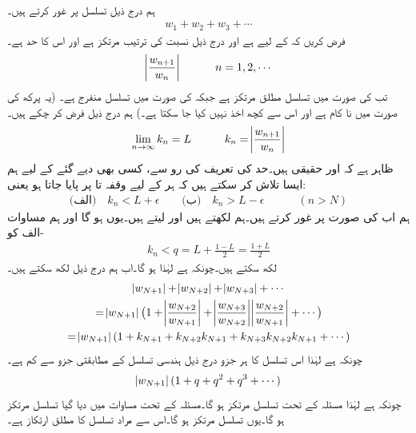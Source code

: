 \quad {}\\
ہم درج ذیل تسلسل پر غور کرتے ہیں۔
\begin{align*}
w_1+w_2+w_3+\cdots
\end{align*}
فرض کریں کہ  کے لیے  ہے اور درج ذیل نسبت کی ترتیب مرتکز ہے اور اس  کا حد  ہے۔
\begin{align*}
\abs{\frac{w_{n+1}}{w_n}}\quad \quad \quad n=1,2,\cdots
\end{align*}
تب  کی صورت میں تسلسل مطلق مرتکز ہے جبکہ  کی صورت میں تسلسل منفرج ہے۔ (یہ پرکھ  کی صورت میں نا کام ہے اور اس سے کچھ اخذ نہیں کیا جا سکتا ہے۔)
\quad
ہم درج ذیل فرض کر چکے ہیں۔
\begin{align*}
\lim_{n\to\infty} k_n=L \quad \quad \quad k_n=\abs{\frac{w_{n+1}}{w_n}}
\end{align*}
ظاہر ہے کہ  اور  حقیقی ہیں۔حد کی تعریف کی رو سے، کسی بھی دیے گئے  کے لیے ہم ایسا  تلاش کر سکتے ہیں کہ ہر  کے لیے  وقفہ  تا  پر پایا جاتا ہو یعنی:
\begin{align}\label{مساوات_ترتیب_نسبت_الف}
\text{(الف)}\quad k_n<L+\epsilon \quad \quad \text{(ب)}\quad k_n>L-\epsilon\quad \quad \quad (n>N)
\end{align}
ہم اب  کی صورت پر غور کرتے ہیں۔ہم  لکھتے ہیں اور  لیتے ہیں۔یوں  ہو گا اور ہم  مساوات -الف کو
\begin{align*}
k_n<q=L+\frac{1-L}{2}=\frac{1+L}{2}
\end{align*}
لکھ سکتے ہیں۔چونکہ  ہے لہٰذا  ہو گا۔اب ہم درج ذیل لکھ سکتے ہیں۔
\begin{multline}\label{مساوات_ترتیب_نسبت_ب}
\abs{w_{N+1}}+\abs{w_{N+2}}+\abs{w_{N+3}}+\cdots\\
=\abs{w_{N+1}}\big(1+\abs{\frac{w_{N+2}}{w_{N+1}}}+\abs{\frac{w_{N+3}}{w_{N+2}}}\abs{\frac{w_{N+2}}{w_{N+1}}}+\cdots\big)\\
=\abs{w_{N+1}}(1+k_{N+1}+k_{N+2}k_{N+1}+k_{N+3}k_{N+2}k_{N+1}+\cdots)
\end{multline}
چونکہ  ہے لہٰذا اس تسلسل کا ہر جزو درج ذیل ہندسی تسلسل کے مطابقتی جزو سے کم ہے۔
\begin{align*}
\abs{w_{N+1}}(1+q+q^2+q^3+\cdots)
\end{align*}
چونکہ  ہے لہٰذا مسئلہ  کے تحت تسلسل مرتکز ہو گا۔مسئلہ  کے تحت  مساوات  میں دیا گیا تسلسل مرتکز ہو گا۔یوں تسلسل  مرتکز ہو گا۔اس سے مراد تسلسل  کا مطلق ارتکاز ہے۔

